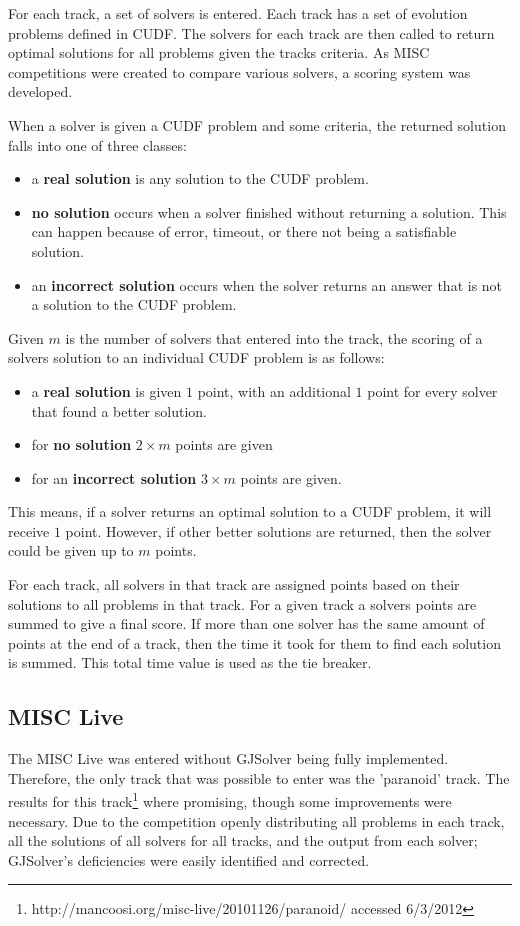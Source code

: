 For each track, a set of solvers is entered.
Each track has a set of evolution problems defined in CUDF.
The solvers for each track are then called to return optimal solutions for all problems given the tracks criteria.
As MISC competitions were created to compare various solvers, a scoring system was developed. 

When a solver is given a CUDF problem and some criteria, the returned solution falls into one of three classes:
\begin{itemize}
  \item a \textbf{real solution} is any solution to the CUDF problem.
  \item \textbf{no solution} occurs when a solver finished without returning a solution. This can happen because of error, timeout, or there not being a satisfiable solution.
  \item an \textbf{incorrect solution} occurs when the solver returns an answer that is not a solution to the CUDF problem.
\end{itemize}

Given $m$ is the number of solvers that entered into the track, the scoring of a solvers solution to an individual CUDF problem is as follows:
\begin{itemize}
  \item a \textbf{real solution} is given $1$ point, with an additional $1$ point for every solver that found a better solution.
  \item for \textbf{no solution} $2\times m$ points are given
  \item for an \textbf{incorrect solution} $3 \times m$ points are given.
\end{itemize}
This means, if a solver returns an optimal solution to a CUDF problem, it will receive $1$ point.
However, if other better solutions are returned, then the solver could be given up to $m$ points.

For each track, all solvers in that track are assigned points based on their solutions to all problems in that track.
For a given track a solvers points are summed to give a final score.
If more than one solver has the same amount of points at the end of a track, then the time it took for them to find each solution is summed.
This total time value is used as the tie breaker.

\subsection{MISC Live}
The MISC Live was entered without GJSolver being fully implemented.
Therefore, the only track that was possible to enter was the 'paranoid' track.
The results for this track\footnote{http://mancoosi.org/misc-live/20101126/paranoid/ accessed 6/3/2012} where promising, though some improvements were necessary.
Due to the competition openly distributing all problems in each track, all the solutions of all solvers for all tracks, 
and the output from each solver;
GJSolver's deficiencies were easily identified and corrected.


